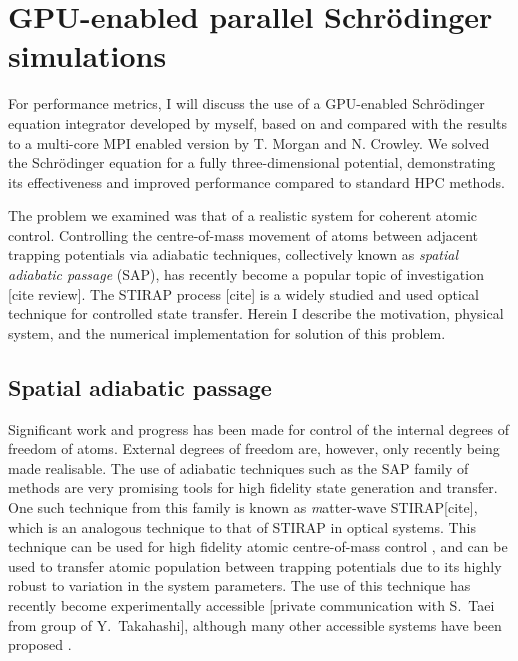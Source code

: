 \section{GPU-enabled parallel Schr\"odinger simulations}
\label{sec:3D Stirap parallel Schr\"odinger simulations}
For performance metrics, I will discuss the use of a GPU-enabled Schr\"odinger equation integrator developed by myself, based on and compared with the results to a multi-core MPI enabled version by T. Morgan and N. Crowley. We solved the Schr\"odinger equation for a fully three-dimensional potential, demonstrating its effectiveness and improved performance compared to standard HPC methods.

The problem we examined was that of a realistic system for coherent atomic control. Controlling the centre-of-mass movement of atoms between adjacent trapping potentials via adiabatic techniques, collectively known as \textit{spatial adiabatic passage} (SAP), has recently become a popular topic of investigation [cite review]. The STIRAP process [cite] is a widely studied and used optical technique for controlled state transfer. Herein I describe the motivation, physical system, and the numerical implementation for solution of this problem.

\subsection{Spatial adiabatic passage}

Significant work and progress has been made for control of the internal degrees of freedom of atoms. External degrees of freedom are, however, only recently being made realisable. The use of adiabatic techniques such as the SAP family of methods are very promising tools for high fidelity state generation and transfer. One such technique from this family is known as {\textit matter-wave STIRAP}[cite], which is an analogous technique to that of STIRAP in optical systems. This technique can be used for high fidelity atomic centre-of-mass control \cite{Eckert:04}, and can be used to transfer atomic population between trapping potentials due to its highly robust to variation in the system parameters. The use of this technique has recently become experimentally accessible [private communication with S.~Taei from group of Y.~Takahashi], although many other accessible systems have been proposed \cite{Eckert:06,Morgan:11,Kohler:13,Morgan:13}.

